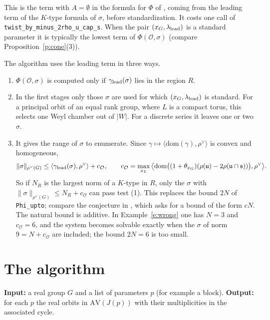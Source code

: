 \documentclass[11pt,leqno]{article}
\theoremstyle{definition}
\numberwithin{equation}{section}
\newcommand{\Ob}{\mathcal O}
\newcommand{\fs}{\mathfrak s}
\newcommand{\fu}{\mathfrak u}
\newcommand{\ch}[1]{#1^\vee}
\newcommand{\AV}{\mathrm{AV}}
\newcommand{\dom}{\mathrm{dom}}
\newcommand{\at}[1]{\texttt{#1}}
\begin{document}
This is the term with $A=\emptyset$ in the formula for $\Phi$ of \cite[Section~6]{KN}, coming
from the leading term of the $K$-type formula of $\sigma$, before
standardization.  It costs one call of
\at{twist\_by\_minus\_2rho\_u\_cap\_s}.  When the pair
$(x_G,\lambda_{\rm lead})$ is a standard parameter it is typically the lowest
term of $\Phi(\Ob,\sigma)$ (compare Proposition~\ref{p:cone}(3)).

The algorithm uses the leading term in three ways.
\begin{enumerate}
\item $\Phi(\Ob,\sigma)$ is computed only if $\gamma_{\rm lead}(\sigma)$ lies
in the region $R$.
\item In the first stages only those $\sigma$ are used for which
$(x_G,\lambda_{\rm lead})$ is standard.  For a principal orbit of an
equal rank group, where $L$ is a compact torus, this selects one Weyl chamber
out of $|W|$.  For a discrete series it leaves one or two $\sigma$.
\item It gives the range of $\sigma$ to enumerate.  Since
$\gamma\mapsto\langle\dom(\gamma),\ch\rho\rangle$ is convex and homogeneous,
\[
\|\sigma\|_{\ch\rho(G)}\le
\langle\gamma_{\rm lead}(\sigma),\ch\rho\rangle+c_\Ob,\qquad
c_\Ob=\max_{x_L}\big\langle\dom\big((1+\theta_{x_G})
(\rho(\fu)-2\rho(\fu\cap\fs))\big),\ch\rho\big\rangle .
\]
So if $N_R$ is the largest norm of a $K$-type in $R$, only the $\sigma$ with
$\|\sigma\|_{\ch\rho(G)}\le N_R+c_\Ob$ can pass test (1).  This replaces the
bound $2N$ of \at{Phi\_upto}; compare the conjecture in \cite[Section~8]{KN},
which asks for a bound of the form $cN$.  The natural bound is additive.
In Example~\ref{e:wrong} one has $N=3$ and $c_\Ob=6$, and the system becomes
solvable exactly when the $\sigma$ of norm $9=N+c_\Ob$ are included; the
bound $2N=6$ is too small.
\end{enumerate}

\section{The algorithm}
\label{s:alg}

\textbf{Input:} a real group $G$ and a list of parameters $p$ (for example a
block).  \textbf{Output:} for each $p$ the real orbits in $\AV(J(p))$ with
their multiplicities in the associated cycle.
\end{document}
